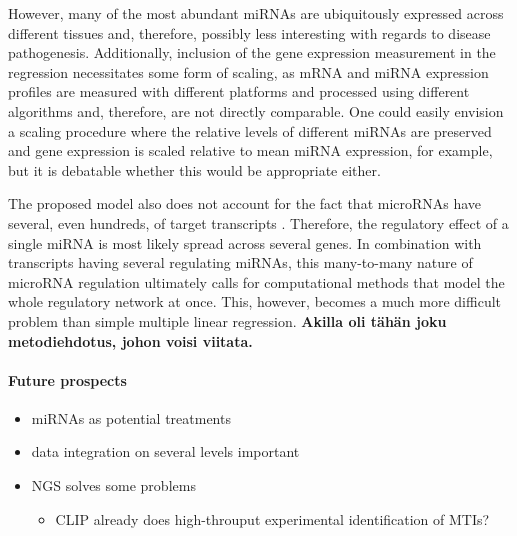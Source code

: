 However, many of the most abundant miRNAs are ubiquitously expressed across
different tissues \citep{Landgraf2007} and, therefore, possibly less
interesting with regards to disease pathogenesis. Additionally, inclusion of
the gene expression measurement in the regression necessitates some form of
scaling, as mRNA and miRNA expression profiles are measured with different platforms
and processed using different algorithms and, therefore, are not directly
comparable. One could easily envision a scaling procedure where the relative
levels of different miRNAs are preserved and gene expression is scaled
relative to mean miRNA expression, for example, but it is debatable whether
this would be appropriate either.

The proposed model also does not account for the fact that microRNAs have
several, even hundreds, of target transcripts \citep{}. Therefore, the regulatory
effect of a single miRNA is most likely spread across several genes. In
combination with transcripts having several regulating miRNAs, this many-to-many
nature of microRNA regulation ultimately calls for computational methods
that model the whole regulatory network at once. This, however, becomes a much
more difficult problem than simple multiple linear regression. \textbf{Akilla
oli tähän joku metodiehdotus, johon voisi viitata.}

\paragraph{Future prospects}

\begin{itemize}
	\item miRNAs as potential treatments
	\item data integration on several levels important
	\item NGS solves some problems
	\begin{itemize}
		\item CLIP already does high-throuput experimental identification of MTIs?
	\end{itemize}
\end{itemize}

